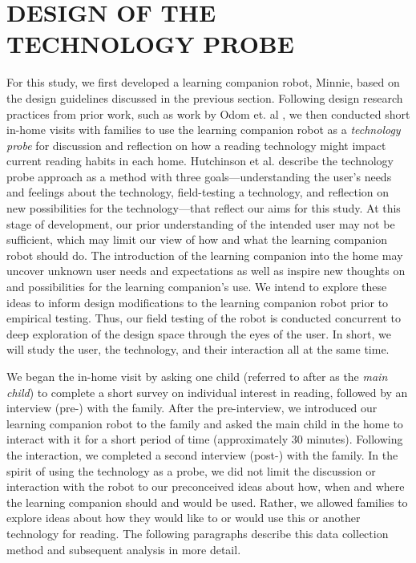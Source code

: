 \documentclass{sigchi}
\begin{document}
\section{DESIGN OF THE TECHNOLOGY PROBE}
 For this study, we first developed a learning companion robot, Minnie, based on the design guidelines discussed in the previous section. Following design research practices from prior work, such as work by Odom et. al \cite{Odom:2012}, we then conducted short in-home visits with families to use the learning companion robot as a \textit{technology probe} \cite{Hutchinson:2003} for discussion and reflection on how a reading technology might impact current reading habits in each home. Hutchinson et al. \cite{Hutchinson:2003} describe the technology probe approach as a method with three goals---understanding the user's needs and feelings about the technology, field-testing a technology, and reflection on new possibilities for the technology---that reflect our aims for this study. At this stage of development, our prior understanding of the intended user may not be sufficient, which may limit our view of how and what the learning companion robot should do. The introduction of the learning companion into the home may uncover unknown user needs and expectations as well as inspire new thoughts on and possibilities for the learning companion's use. We intend to explore these ideas to inform design modifications to the learning companion robot prior to empirical testing. Thus, our field testing of the robot is conducted concurrent to deep exploration of the design space through the eyes of the user. In short, we will study the user, the technology, and their interaction all at the same time.

 
We began the in-home visit by asking one child (referred to after as the \textit{main child}) to complete a short survey on individual interest in reading, followed by an interview (pre-) with the family. After the pre-interview, we introduced our learning companion robot to the family and asked the main child in the home to interact with it for a short period of time (approximately 30 minutes). Following the interaction, we completed a second interview (post-) with the family. In the spirit of using the technology as a probe, we did not limit the discussion or interaction with the robot to our preconceived ideas about how, when and where the learning companion should and would be used. Rather, we allowed families to explore ideas about how they would like to or would use this or another technology for reading. The following paragraphs describe this data collection method and subsequent analysis in more detail.
 
\end{document}
